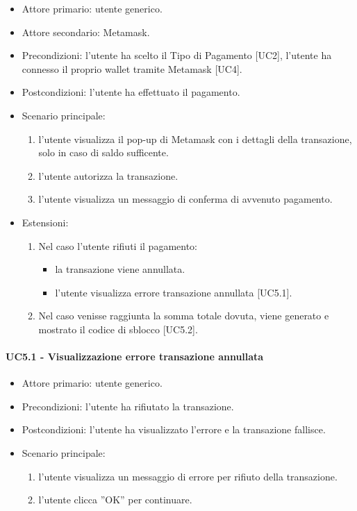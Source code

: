 \begin{itemize}
    \item Attore primario: utente generico.
    \item Attore secondario: Metamask.
    \item Precondizioni: l'utente ha scelto il Tipo di Pagamento [UC2], l'utente ha connesso il proprio wallet tramite Metamask [UC4].
    \item Postcondizioni: l'utente ha effettuato il pagamento.
    \item Scenario principale: \begin{enumerate}
        \item l'utente visualizza il pop-up di Metamask con i dettagli della transazione, solo in caso di saldo sufficente.
        \item l'utente autorizza la transazione.
        \item l'utente visualizza un messaggio di conferma di avvenuto pagamento.
    \end{enumerate}
    \item Estensioni: \begin{enumerate}
        \item Nel caso l'utente rifiuti il pagamento: \begin{itemize}
            \item la transazione viene annullata.
            \item l'utente visualizza errore transazione annullata [UC5.1].
        \end{itemize}
        \item Nel caso venisse raggiunta la somma totale dovuta, viene generato e mostrato il codice di sblocco [UC5.2].
    \end{enumerate}
\end{itemize}

\paragraph{UC5.1 - Visualizzazione errore transazione annullata}

\begin{itemize}
    \item Attore primario: utente generico.
    \item Precondizioni: l'utente ha rifiutato la transazione.
    \item Postcondizioni: l'utente ha visualizzato l'errore e la transazione fallisce.
    \item Scenario principale: \begin{enumerate}
        \item l'utente visualizza un messaggio di errore per rifiuto della transazione.
        \item l’utente clicca ”OK” per continuare.
    \end{enumerate}
\end{itemize}

